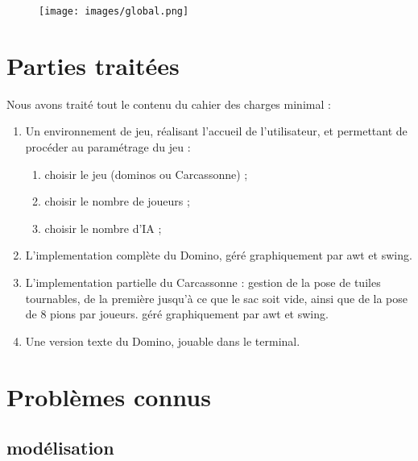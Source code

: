 \documentclass{article}
\begin{document}
\begin{figure}[t]
\centerline{\texttt{[image: images/global.png]}}
\end{figure}
	







\section{Parties traitées}
Nous avons traité tout le contenu du cahier des charges minimal :
\begin{enumerate}
    \item Un environnement de jeu, réalisant l’accueil de l’utilisateur, et permettant de procéder au paramétrage du jeu :
    \begin{enumerate}
        \item choisir le jeu (dominos ou Carcassonne) ;
        \item choisir le nombre de joueurs ;
        \item choisir le nombre d'IA ;
    \end{enumerate}
    \item L'implementation complète du Domino, géré graphiquement par awt et swing.
    \item L'implementation partielle du Carcassonne : gestion de la pose de tuiles tournables, de la première jusqu'à ce que le sac soit vide, ainsi que de la pose de 8 pions par joueurs. géré graphiquement par awt et swing.
    \item Une version texte du Domino, jouable dans le terminal.
\end{enumerate}

\section{Problèmes connus}

\subsection{modélisation} 
\end{document}
